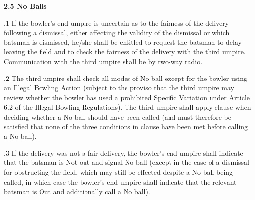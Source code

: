 \documentclass[12pt]{article}
\begin{document}
\vspace{\baselineskip}
{\fontsize{11pt}{13.2pt}\selectfont \textbf{2.5 \tabto{0.47in} No Balls}\par}\par


\vspace{\baselineskip}
\begin{adjustwidth}{0.5in}{0.04in}
{\fontsize{9pt}{10.8pt}.1 \tabto{0.49in} If the bowler’s end umpire is uncertain as to the fairness of the delivery following a dismissal, either affecting the validity of the dismissal or which batsman is dismissed, he/she shall be entitled to request the batsman to delay leaving the field and to check the fairness of the delivery with the third umpire. Communication with the third umpire shall be by two-way radio.\par}\par

\end{adjustwidth}


\vspace{\baselineskip}
\begin{adjustwidth}{0.5in}{0.03in}
{\fontsize{9pt}{10.8pt}.2 \tabto{0.49in} The third umpire shall check all modes of No ball except for the bowler using an Illegal Bowling Action (subject to the proviso that the third umpire may review whether the bowler has used a prohibited Specific Variation under Article 6.2 of the Illegal Bowling Regulations). The third umpire shall apply clause when deciding whether a No ball should have been called (and must therefore be satisfied that none of the three conditions in clause have been met before calling a No ball).\par}\par

\end{adjustwidth}


\vspace{\baselineskip}
\begin{adjustwidth}{0.5in}{0.01in}
{\fontsize{9pt}{10.8pt}.3 \tabto{0.49in} If the delivery was not a fair delivery, the bowler’s end umpire shall indicate that the batsman is Not out and signal No ball (except in the case of a dismissal for obstructing the field, which may still be effected despite a No ball being called, in which case the bowler’s end umpire shall indicate that the relevant batsman is Out and additionally call a No ball).\par}\par

\end{adjustwidth}
\end{document}

